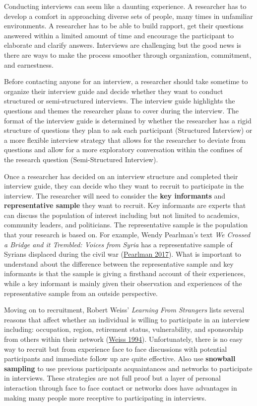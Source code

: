 \documentclass{book}
\begin{document}
Conducting interviews can seem like a daunting experience. A researcher has to
develop a comfort in approaching diverse sets of people, many times in
unfamiliar environments. A researcher has to be able to build rapport, get
their questions answered within a limited amount of time and encourage the
participant to elaborate and clarify answers. Interviews are challenging but
the good news is there are ways to make the process smoother through
organization, commitment, and earnestness.

Before contacting anyone for an interview, a researcher should take sometime
to organize their interview guide and decide whether they want to conduct
structured or semi-structured interviews. The interview guide highlights the
questions and themes the researcher plans to cover during the interview. The
format of the interview guide is determined by whether the researcher has a
rigid structure of questions they plan to ask each participant (Structured
Interview) or a more flexible interview strategy that allows for the
researcher to deviate from questions and allow for a more exploratory
conversation within the confines of the research question (Semi-Structured
Interview).

Once a researcher has decided on an interview structure and completed their
interview guide, they can decide who they want to recruit to participate in
the interview. The researcher will need to consider the \textbf{key
informants} and \textbf{representative sample} they want to recruit. Key
informants are experts that can discuss the population of interest including
but not limited to academics, community leaders, and politicians. The
representative sample is the population that your research is based on. For
example, Wendy Pearlman's text \emph{We Crossed a Bridge and it Trembled:
Voices from Syria} has a representative sample of Syrians displaced during the
civil war (\protect\hyperlink{ref-pearlmanWeCrossedBridge2017}{Pearlman
2017}). What is important to understand about the difference between the
representative sample and key informants is that the sample is giving a
firsthand account of their experiences, while a key informant is mainly given
their observation and experiences of the representative sample from an outside
perspective.

Moving on to recruitment, Robert Weiss' \emph{Learning From Strangers} lists
several reasons that affect whether an individual is willing to participate in
an interview including: occupation, region, retirement status, vulnerability,
and sponsorship from others within their network
(\protect\hyperlink{ref-weiss1994a}{Weiss 1994}). Unfortunately, there is no
easy way to recruit but from experience face to face discussions with
potential participants and immediate follow up are quite effective. Also use
\textbf{snowball sampling} to use previous participants acquaintances and
networks to participate in interviews. These strategies are not full proof but
a layer of personal interaction through face to face contact or networks does
have advantages in making many people more receptive to participating in
interviews.
\end{document}

